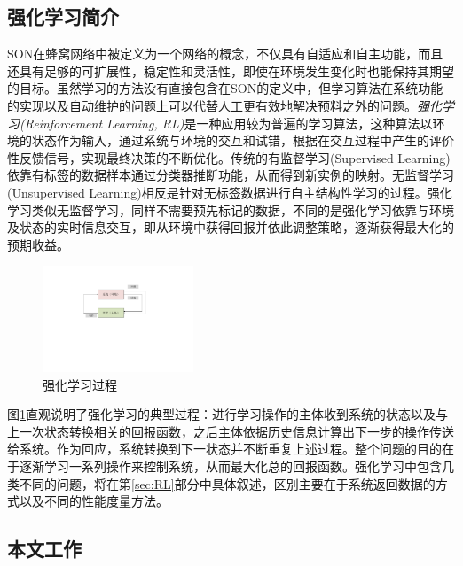 ﻿\documentclass[11pt,draftclsnofoot,onecolumn,journal,letterpaper]{IEEEtran}
\begin{document}
\subsection{强化学习简介}


SON在蜂窝网络中被定义为一个网络的概念，不仅具有自适应和自主功能，而且还具有足够的可扩展性，稳定性和灵活性，即使在环境发生变化时也能保持其期望的目标。虽然学习的方法没有直接包含在SON的定义中，但学习算法在系统功能的实现以及自动维护的问题上可以代替人工更有效地解决预料之外的问题。\emph{强化学习(Reinforcement Learning, RL)}是一种应用较为普遍的学习算法，这种算法以环境的状态作为输入，通过系统与环境的交互和试错，根据在交互过程中产生的评价性反馈信号，实现最终决策的不断优化。传统的有监督学习(Supervised Learning)依靠有标签的数据样本通过分类器推断功能，从而得到新实例的映射。无监督学习(Unsupervised Learning)相反是针对无标签数据进行自主结构性学习的过程。强化学习类似无监督学习，同样不需要预先标记的数据，不同的是强化学习依靠与环境及状态的实时信息交互，即从环境中获得回报并依此调整策略，逐渐获得最大化的预期收益。
\begin{figure}%
\centerline{\includegraphics[width=0.4\textwidth]{reinforcement.pdf}}
\caption{强化学习过程}
\label{fig:rein}
\end{figure}

图\ref{fig:rein}直观说明了强化学习的典型过程：进行学习操作的主体收到系统的状态以及与上一次状态转换相关的回报函数，之后主体依据历史信息计算出下一步的操作传送给系统。作为回应，系统转换到下一状态并不断重复上述过程。整个问题的目的在于逐渐学习一系列操作来控制系统，从而最大化总的回报函数。强化学习中包含几类不同的问题，将在第\ref{sec:RL}部分中具体叙述，区别主要在于系统返回数据的方式以及不同的性能度量方法。


\subsection{本文工作}
\end{document}
